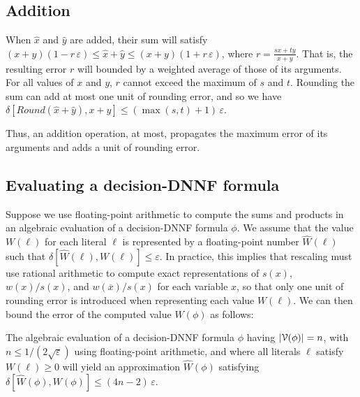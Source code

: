 \documentclass[letterpaper,USenglish,cleveref, autoref, thm-restate]{lipics-v2021}
\newcommand{\obar}[1]{\overline{#1}}
\newcommand{\lit}{\ell}
\newcommand{\approximate}[1]{\hat{#1}}
\newcommand{\approxx}{\approximate{x}}
\newcommand{\approxy}{\approximate{y}}
\newcommand{\approxW}{\approximate{W}}
\newcommand{\round}{\mathit{Round}}
\newcommand{\aerror}{\delta}
\newcommand{\roundepsilon}{\varepsilon}
\newcommand{\dependencyset}{{\cal V}}
\begin{document}
\subsection{Addition}

When $\approxx$ and $\approxy$ are added, their sum will satisfy
$(x + y) (1 - r\,\roundepsilon) \leq \approxx + \approxy \leq (x + y) (1 + r\,\roundepsilon)$, where $r = \frac{sx + ty}{x+y}$.  That is, the resulting error $r$ will bounded by a weighted average
of those of its arguments.  For all values of $x$ and $y$, $r$ cannot exceed the maximum of $s$ and $t$.
Rounding the sum can add at most one unit of rounding error, and so we have
$\aerror[\round(\approxx + \approxy), x + y] \leq (\max(s,t)+1)\,\roundepsilon$.

Thus, an addition operation, at most, propagates the maximum error of its arguments and adds a unit of rounding error.

\subsection{Evaluating a decision-DNNF formula}
\label{sect:error:formula}

Suppose we use floating-point arithmetic to compute the sums and
products in an algebraic evaluation of a decision-DNNF formula $\phi$.
We assume that the value $W(\lit)$ for each literal $\lit$ is
represented by a floating-point number $\approxW(\lit)$ such that
$\aerror[\approxW(\lit), W(\lit)] \leq \roundepsilon$.  In practice,
this implies that rescaling must use rational arithmetic to
compute exact representations of $s(x)$, $w(x)/s(x)$, and
$w(\obar{x})/s(x)$ for each variable $x$, so that only one unit of
rounding error is introduced when representing each value $W(\lit)$.
We can then bound the error of the computed value $W(\phi)$ as follows:
\begin{lemma}
  The algebraic evaluation of a decision-DNNF formula $\phi$  having $|\dependencyset(\phi)| = n$, with $n \leq 1/(2\sqrt{\roundepsilon})$ using floating-point arithmetic,
  and where all literals $\ell$ satisfy $W(\lit) \geq 0$
  will yield an approximation $\approxW(\phi)$ satisfying
  $\aerror[\approxW(\phi), W(\phi)] \leq (4n-2)\,\roundepsilon$.
  \label{lemma:approx:pos}
\end{lemma}
\end{document}

